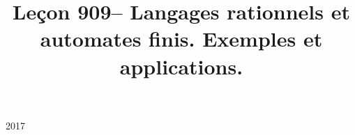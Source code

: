 \documentclass{agregfiche}
\title{Leçon 909-- Langages rationnels et automates finis.  Exemples et applications.}
\begin{document}
\maketitle

\secrapports

\begin{rapport}{2017}

\end{rapport}

\secindispensables

\secpieges


\secidees


\secquestionsclassiques


\secreferences


\secdev
\end{document}
